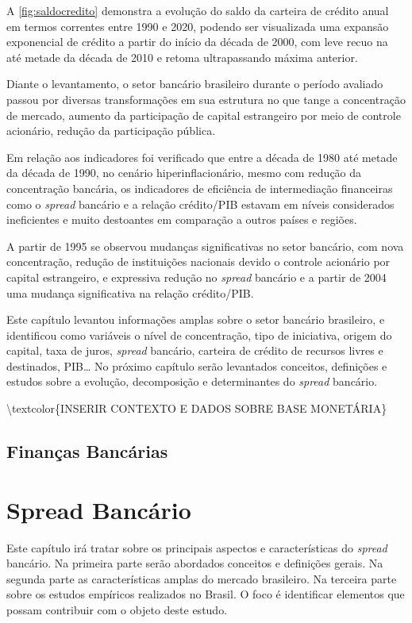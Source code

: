 \documentclass[12pt,openright,oneside,a4paper,chapter=TITLE,section=TITLE,subsection=Title,english,french,spanish,portugues,sumario=tradicional]{04-class-files/abntex2}
\begin{document}
A \autoref{fig:saldocredito} demonstra a evolução do saldo da carteira de
crédito anual em termos correntes entre 1990 e 2020, podendo ser visualizada
uma expansão exponencial de crédito a partir do início da década de 2000, com
leve recuo na até metade da década de 2010 e retoma ultrapassando máxima
anterior.

Diante o levantamento, o setor bancário brasileiro durante o período avaliado
passou por diversas transformações em sua estrutura no que tange a concentração
de mercado, aumento da participação de capital estrangeiro por meio de controle
acionário, redução da participação pública.

Em relação aos indicadores foi verificado que entre a década de 1980 até metade da década de 1990, no cenário hiperinflacionário, mesmo com redução da concentração bancária, os indicadores de eficiência de intermediação financeiras como o \emph{spread} bancário e a relação crédito/PIB estavam em níveis considerados ineficientes e muito destoantes em comparação a outros países e regiões.

A partir de 1995 se observou mudanças significativas no setor bancário, com nova concentração, redução de instituições nacionais devido o controle acionário por capital estrangeiro, e expressiva redução no \emph{spread} bancário e a partir de 2004 uma mudança significativa na relação crédito/PIB.

Este capítulo levantou informações amplas sobre o setor bancário brasileiro, e identificou como variáveis o nível de concentração, tipo de iniciativa, origem do capital, taxa de juros, \emph{spread} bancário, carteira de crédito de recursos livres e destinados, PIB\ldots{} No próximo capítulo serão levantados conceitos, definições e estudos sobre a evolução, decomposição e determinantes do \emph{spread} bancário.

\textbackslash{}textcolor\{INSERIR CONTEXTO E DADOS SOBRE BASE MONETÁRIA\}

\section{Finanças Bancárias}

\textual
\pagestyle{simple}

\chapter{Spread Bancário}

Este capítulo irá tratar sobre os principais aspectos e características do
\emph{spread} bancário. Na primeira parte serão abordados conceitos e definições
gerais. Na segunda parte as características amplas do mercado brasileiro. Na
terceira parte sobre os estudos empíricos realizados no Brasil. O foco é
identificar elementos que possam contribuir com o objeto deste estudo.
\end{document}
